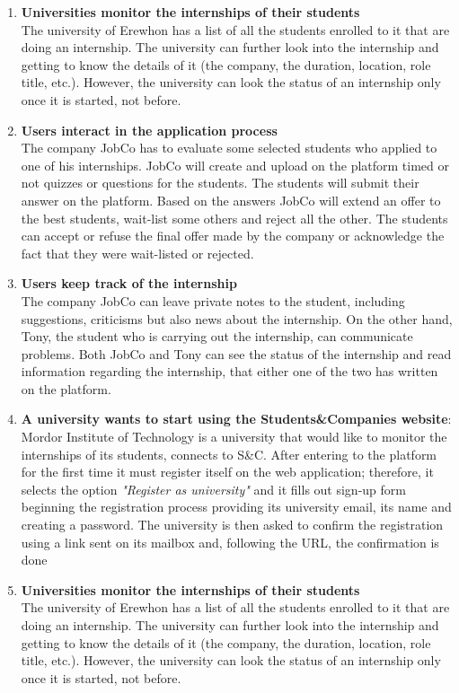 \begin{enumerate}
            \item \textbf{Universities monitor the internships of their students }
            \\ The university of Erewhon has a list of all the students enrolled to it that are doing an internship. The university can further look into the internship and getting to know the details of it (the company, the duration, location, role title, etc.). However, the university can look the status of an internship only once it is started, not before.
            
            \item \textbf{Users interact in the application process}
            \\ The company JobCo has to evaluate some selected students who applied to one of his internships. JobCo will create and upload on the platform timed or not quizzes or questions for the students. The students will submit their answer on the platform. Based on the answers JobCo will extend an offer to the best students, wait-list some others and reject all the other. The students can accept or refuse the final offer made by the company or acknowledge the fact that they were wait-listed or rejected.
            
            \item \textbf{Users keep track of the internship }
            \\ The company JobCo can leave private notes to the student, including suggestions, criticisms but also news about the internship. On the other hand, Tony, the student who is carrying out the internship, can communicate problems. Both JobCo and Tony can see the status of the internship and read information regarding the internship, that either one of the two has written on the platform.

            \item \textbf{A university wants to start using the Students\&Companies website}:
            Mordor Institute of Technology is a university that would like to monitor the internships of its students, connects to S\&C. After entering to the platform for the first time it must register itself on the web application; therefore, it selects the option \textit{"Register as university"} and it fills out sign-up form beginning the registration process providing its university email, its name and creating a password. The university is then asked to confirm the registration using a link sent on its mailbox and, following the URL, the confirmation is done
            
            \item \textbf{Universities monitor the internships of their students }
            \\ The university of Erewhon has a list of all the students enrolled to it that are doing an internship. The university can further look into the internship and getting to know the details of it (the company, the duration, location, role title, etc.). However, the university can look the status of an internship only once it is started, not before.
        \end{enumerate}

